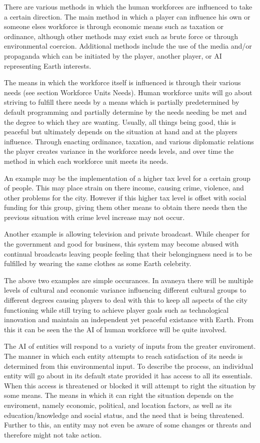 There are various methods in which the human workforces are influenced to take a certain direction. The main method in which a player can influence his own or someone elses workforce is through economic means such as taxation or ordinance, although other methods may exist such as brute force or through environmental coercion. Additional methods include the use of the media and/or propaganda which can be initiated by the player, another player, or AI representing Earth interests.

The means in which the workforce itself is influenced is through their various needs (see section Workforce Units Needs). Human workforce units will go about striving to fulfill there needs by a means which is partially predetermined by default programming and partially determine by the needs needing be met and the degree to which they are wanting. Usually, all things being good, this is peaceful but ultimately depends on the situation at hand and at the players influence. Through enacting ordinance, taxation, and various diplomatic relations the player creates variance in the workforce needs levels, and over time the method in which each workforce unit meets its needs.

An example may be the implementation of a higher tax level for a certain group of people. This may place strain on there income, causing crime, violence, and other problems for the city. However if this higher tax level is offset with social funding for this group, giving them other means to obtain there needs then the previous situation with crime level increase may not occur. 

Another example is allowing television and private broadcast. While cheaper for the government and good for business, this system may become abused with continual broadcasts leaving people feeling that their belongingness need is to be fulfilled by wearing the same clothes as some Earth celebrity. 

The above two examples are simple occurances. In avaneya there will be multiple levels of cultural and economic variance influencing different cultural groups to different degrees causing players to deal with this to keep all aspects of the city functioning while still trying to achieve player goals such as technological innovation and maintain an independent yet peaceful existance with Earth. From this it can be seen the the AI of human workforce will be quite involved.   

The AI of entities will respond to a variety of inputs from the greater enviroment. The manner in which each entity attempts to reach satisfaction of its needs is determined from this environmental input. To describe the process, an individual entity will go about in its default state provided it has access to all its essentials. When this access is threatened or blocked it will attempt to right the situation by some means. The means in which it can right the situation depends on the enviroment, namely economic, political, and location factors, as well as its education/knowledge and social status, and the need that is being threatened. Further to this, an entity may not even be aware of some changes or threats and therefore might not take action.

